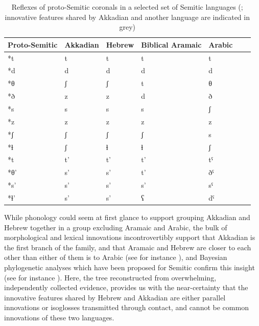 \documentclass[svgnames,12pt]{scrartcl}
\newcommand{\ipa}[1]{{{\phon\mbox{#1}}}}
\newcommand{\grise}[1]{\cellcolor{lightgray}\textbf{#1}}
\begin{document}
{{\begin{table}[h]
\caption{Reflexes of proto-Semitic coronals in a selected set of Semitic languages (\citealt{huehnergard97}; innovative features shared by Akkadian and another language are indicated in grey)} \label{tab:protosem} \centering
\begin{tabular}{lllllll}
\toprule
Proto-Semitic & Akkadian & Hebrew & Biblical Aramaic & Arabic \\
\midrule
\ipa{*t} & \ipa{t} & \ipa{t} & \ipa{t} & \ipa{t} \\
\ipa{*d} & \ipa{d} & \ipa{d} & \ipa{d} & \ipa{d} \\
\ipa{*θ} & \ipa{ʃ} \grise{}& \ipa{ʃ} \grise{}& \ipa{t} & \ipa{θ} \\
\ipa{*ð} & \ipa{z} \grise{}& \ipa{z} \grise{}& \ipa{d} & \ipa{ð} \\
\ipa{*s} & \ipa{s} & \ipa{s} & \ipa{s} & \ipa{ʃ} &\\
\ipa{*z} & \ipa{z} & \ipa{z} & \ipa{z} & \ipa{z} \\
\ipa{*ʃ} & \ipa{ʃ} & \ipa{ʃ} & \ipa{ʃ} & \ipa{s} &\\
\ipa{*ɬ} & \ipa{ʃ} \grise{}& \ipa{ɬ} & \ipa{ɬ} &  \ipa{ʃ} \grise{}\\
\ipa{*t} & \ipa{t'} & \ipa{t'} & \ipa{t'} & \ipa{tˤ} \\
\ipa{*θ'} & \ipa{s'} \grise{}& \ipa{s'} \grise{}& \ipa{t'} & \ipa{ðˤ} \\
\ipa{*s'} & \ipa{s'}  & \ipa{s'} & \ipa{s'} & \ipa{sˤ} &\\
\ipa{*ɬ'} & \ipa{s'} \grise{}& \ipa{s'} \grise{}& \ipa{ʕ} &  \ipa{dˤ} \\
\bottomrule
\end{tabular}
\end{table}

While phonology could seem at first glance to support grouping Akkadian and Hebrew together in a
group excluding Aramaic and Arabic, the bulk of morphological and lexical innovations
incontrovertibly support that Akkadian is the first branch of the family, and that Aramaic and
Hebrew are closer to each other than either of them is to Arabic (see for instance
\citealt{hetzron76two, huehnergard06protosemitic}), and Bayesian phylogenetic analyses which have
been proposed for Semitic confirm this insight (see for instance \citealt{nicholls11semitic}).
Here, the tree reconstructed from overwhelming, independently collected evidence, provides us with
the near-certainty that the innovative features shared by Hebrew and Akkadian are either parallel
innovations or isoglosses transmitted through contact, and cannot be common innovations of these two
languages.

}}
\end{document}
